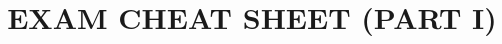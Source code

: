 \documentclass[%
 aip,
 jmp,%
 amsmath,amssymb,
 reprint,%
]{revtex4-1}
\begin{document}

\title[STAT7055 - INTRODUCTORY STATISTICS FOR BUSINESS AND FINANCE]{EXAM CHEAT SHEET (PART I)}%






\maketitle

\end{document}
